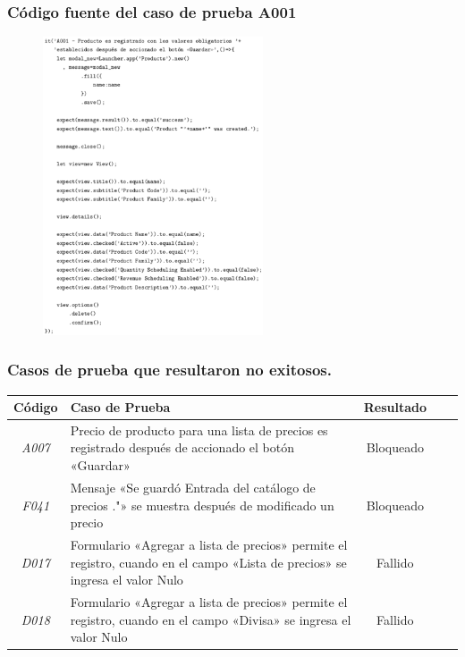 \documentclass{beamer}
\begin{document}
\begin{frame}
\frametitle{Código fuente del caso de prueba A001}
\begin{figure}
\centering
\includegraphics[width=0.58\textwidth]{graphics/figure4.eps}
\end{figure}
\end{frame}

\begin{frame}
\frametitle{Casos de prueba que resultaron no exitosos.}
\begin{table}
\tiny
\centering
\begin{tabular}{|c|p{5.4cm}|c|c|c|}
\hline
\tiny{\textbf{Código}} & \tiny{\textbf{Caso de Prueba}} &
\tiny{\textbf{Resultado}} \\
\hline
\tiny{\emph{A007}} &
\tiny{Precio de producto para una lista de precios es registrado después
de accionado el botón «Guardar»} &
\tiny{Bloqueado} 
\\
\tiny{\emph{F041}} &
\tiny{Mensaje «Se guardó Entrada del catálogo de precios ."» se muestra
después de modificado un precio} &
\tiny{Bloqueado}
\\
\tiny{\emph{D017}} &
\tiny{Formulario «Agregar a lista de precios» permite el registro,
cuando en el campo «Lista de precios» se ingresa el valor Nulo} &
\tiny{Fallido} 
\\
\tiny{\emph{D018}} &
\tiny{Formulario «Agregar a lista de precios» permite el registro,
cuando en el campo «Divisa» se ingresa el valor Nulo} &
\tiny{Fallido}
\\
\hline
\end{tabular}
\end{table}
\end{frame}
\end{document}
